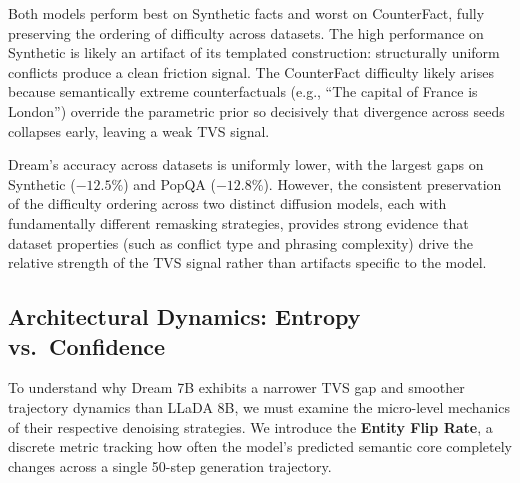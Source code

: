 \documentclass[11pt]{article}
\begin{document}
\begin{table}[h]
\centering
{}
\caption{Detection accuracy (\%) by domain (LR classifier, mean $\pm$ std over 5 splits). The ordering of difficulty across datasets (Synth.\ $>$ SciQ $>$ PopQA $>$ CounterFact) is preserved across both architectures.}
\label{tab:dataset_breakdown}
\end{table}

Both models perform best on Synthetic facts and worst on CounterFact, fully preserving the ordering of difficulty across datasets. The high performance on Synthetic is likely an artifact of its templated construction: structurally uniform conflicts produce a clean friction signal. The CounterFact difficulty likely arises because semantically extreme counterfactuals (e.g., ``The capital of France is London'') override the parametric prior so decisively that divergence across seeds collapses early, leaving a weak TVS signal.

Dream's accuracy across datasets is uniformly lower, with the largest gaps on Synthetic ($-12.5\%$) and PopQA ($-12.8\%$). However, the consistent preservation of the difficulty ordering across two distinct diffusion models, each with fundamentally different remasking strategies, provides strong evidence that dataset properties (such as conflict type and phrasing complexity) drive the relative strength of the TVS signal rather than artifacts specific to the model.

\subsection{Architectural Dynamics: Entropy vs.\ Confidence}
To understand why Dream 7B exhibits a narrower TVS gap and smoother trajectory dynamics than LLaDA 8B, we must examine the micro-level mechanics of their respective denoising strategies. We introduce the \textbf{Entity Flip Rate}, a discrete metric tracking how often the model's predicted semantic core completely changes across a single 50-step generation trajectory.
\end{document}
